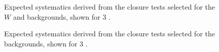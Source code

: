 \begin{figure}[]
  \centering
  \caption{\label{fig:systematics-ttW} Expected systematics derived from
  the closure tests selected for the $W$ and \ttbar backgrounds, shown for
  3 \ifb.}
\end{figure}

\begin{figure}[]
  \centering
  \caption{\label{fig:systematics-Zinv} Expected systematics derived from
  the closure tests selected for the \znunu backgrounds, shown for 3 \ifb.}
\end{figure}


